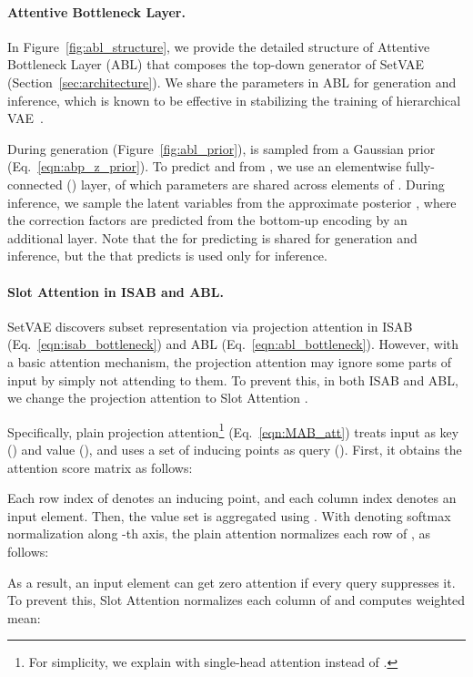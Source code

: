 \documentclass[final]{arxiv/cvpr}
\begin{document}
\paragraph{Attentive Bottleneck Layer.}
In Figure~\ref{fig:abl_structure}, we provide the detailed structure of Attentive Bottleneck Layer (ABL) that composes the top-down generator of SetVAE (Section~\ref{sec:architecture}).
We share the parameters in ABL for generation and inference, which is known to be effective in stabilizing the training of hierarchical VAE~\cite{kingma2017improving, vahdat2020nvae}.

During generation (Figure~\ref{fig:abl_prior}),  is sampled from a Gaussian prior  (Eq.~\eqref{eqn:abp_z_prior}).
To predict  and  from , we use an elementwise fully-connected () layer, of which parameters are shared across elements of .
During inference, we sample the latent variables from the approximate posterior , where the correction factors  are predicted from the bottom-up encoding  by an additional  layer.
Note that the  for predicting  is shared for generation and inference, but the  that predicts  is used only for inference.
\\

\paragraph{Slot Attention in ISAB and ABL.}
SetVAE discovers subset representation via projection attention in ISAB (Eq.~\eqref{eqn:isab_bottleneck}) and ABL (Eq.~\eqref{eqn:abl_bottleneck}).
However, with a basic attention mechanism, the projection attention may ignore some parts of input by simply not attending to them.
To prevent this, in both ISAB and ABL, we change the projection attention to Slot Attention \cite{locatello2020objectcentric}.

Specifically, plain projection attention\footnote{For simplicity, we explain with single-head attention instead of .} (Eq.~\eqref{eqn:MAB_att}) treats input  as key () and value (), and uses a set of inducing points  as query ().
First, it obtains the attention score matrix as follows:

Each row index of  denotes an inducing point, and each column index denotes an input element.
Then, the value set  is aggregated using .
With  denoting softmax normalization along -th axis, the plain attention normalizes each row of , as follows:

As a result, an input element can get zero attention if every query suppresses it.
To prevent this, Slot Attention normalizes each column of  and computes weighted mean:
\end{document}
